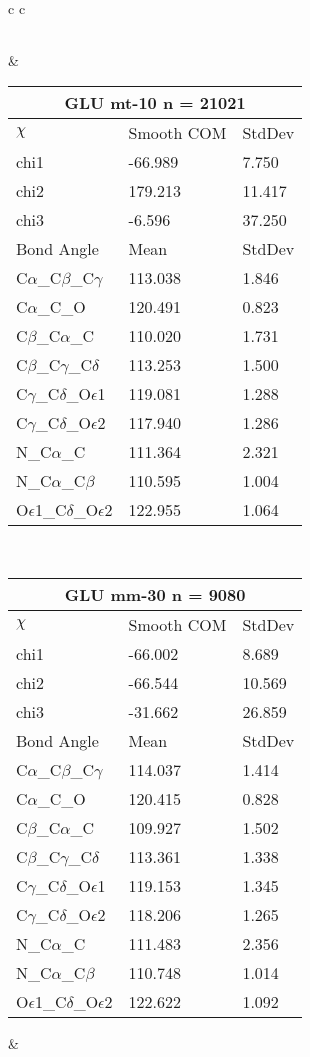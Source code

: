 \begin{longtable}{ c c }
\begin{tabular}{ l l l }
  \end{tabular}
  &
  \begin{tabular}{ l l l }
  \toprule
  \multicolumn{3}{c}{GLU \textbf{mt-10} n = 21021} \\ \toprule
  $\chi$       & Smooth COM & StdDev \\ \midrule
  chi1 & -66.989 & 7.750 \\ 
  chi2 & 179.213 & 11.417 \\ 
  chi3 & -6.596 & 37.250 \\ \midrule
  Bond Angle   & Mean     & StdDev \\ \midrule
  C$\alpha$\_C$\beta$\_C$\gamma$ & 113.038 & 1.846\\
  C$\alpha$\_C\_O & 120.491 & 0.823\\
  C$\beta$\_C$\alpha$\_C & 110.020 & 1.731\\
  C$\beta$\_C$\gamma$\_C$\delta$ & 113.253 & 1.500\\
  C$\gamma$\_C$\delta$\_O$\epsilon$1 & 119.081 & 1.288\\
  C$\gamma$\_C$\delta$\_O$\epsilon$2 & 117.940 & 1.286\\
  N\_C$\alpha$\_C & 111.364 & 2.321\\
  N\_C$\alpha$\_C$\beta$ & 110.595 & 1.004\\
  O$\epsilon$1\_C$\delta$\_O$\epsilon$2 & 122.955 & 1.064\\
  \bottomrule
  \end{tabular}
  \\
  \begin{tabular}{ l l l }
  \toprule
  \multicolumn{3}{c}{GLU \textbf{mm-30} n = 9080} \\ \toprule
  $\chi$       & Smooth COM & StdDev \\ \midrule
  chi1 & -66.002 & 8.689 \\ 
  chi2 & -66.544 & 10.569 \\ 
  chi3 & -31.662 & 26.859 \\ \midrule
  Bond Angle   & Mean     & StdDev \\ \midrule
  C$\alpha$\_C$\beta$\_C$\gamma$ & 114.037 & 1.414\\
  C$\alpha$\_C\_O & 120.415 & 0.828\\
  C$\beta$\_C$\alpha$\_C & 109.927 & 1.502\\
  C$\beta$\_C$\gamma$\_C$\delta$ & 113.361 & 1.338\\
  C$\gamma$\_C$\delta$\_O$\epsilon$1 & 119.153 & 1.345\\
  C$\gamma$\_C$\delta$\_O$\epsilon$2 & 118.206 & 1.265\\
  N\_C$\alpha$\_C & 111.483 & 2.356\\
  N\_C$\alpha$\_C$\beta$ & 110.748 & 1.014\\
  O$\epsilon$1\_C$\delta$\_O$\epsilon$2 & 122.622 & 1.092\\
  \bottomrule
  \end{tabular}
  &
  \\
  
\end{longtable}    

